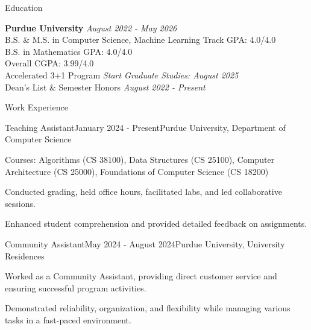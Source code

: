\documentclass[
    11pt, %
]{resume} %
\begin{document}

\small
\begin{rSection}{Education}

    \textbf{Purdue University} \hfill \textit{August 2022 - May 2026} \\
    B.S. \& M.S. in Computer Science, Machine Learning Track \hfill GPA: 4.0/4.0 \\
    B.S. in Mathematics \hfill GPA: 4.0/4.0 \\
    \hspace*{\fill}  Overall CGPA: 3.99/4.0 \\
    Accelerated 3+1 Program \hfill {\em Start Graduate Studies: August 2025} \\
    Dean's List \& Semester Honors \hfill {\em August 2022 - Present}

\end{rSection}

\vspace*{-0.5cm}


\begin{rSection}{Work Experience}
    \begin{rSubsection}{Teaching Assistant}{January 2024 - Present}{Purdue University, Department of Computer Science}{}
        \item Courses: Algorithms (CS 38100), Data Structures (CS 25100), Computer Architecture (CS 25000), Foundations of Computer Science (CS 18200)
        \item Conducted grading, held office hours, facilitated labs, and led collaborative sessions.
        \item Enhanced student comprehension and provided detailed feedback on assignments.
    \end{rSubsection}
    \begin{rSubsection}{Community Assistant}{May 2024 - August 2024}{Purdue University, University Residences}{}
      \item Worked as a Community Assistant, providing direct customer service and ensuring successful program activities. 
      \item Demonstrated reliability, organization, and flexibility while managing various tasks in a fast-paced environment.
    \end{rSubsection}
\end{rSection}
\end{document}
